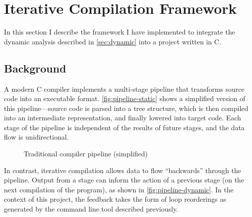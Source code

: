 \documentclass[journal]{IEEEtran}
\begin{document}
\section{Iterative Compilation Framework} \label{sec:iter}

In this section I describe the framework I have implemented to integrate the
dynamic analysis described in \autoref{sec:dynamic} into a project written in C.

\subsection{Background}

A modern C compiler implements a multi-stage pipeline that transforms source
code into an executable format. \autoref{fig:pipeline-static} shows a simplified
version of this pipeline---source code is parsed into a tree structure, which is
then compiled into an intermediate representation, and finally lowered into
target code. Each stage of the pipeline is independent of the results of future
stages, and the data flow is unidirectional.

\begin{figure}[h] 
  \centering 
  \caption{Traditional compiler pipeline (simplified)} 
  \label{fig:pipeline-static}
\end{figure}

In contrast, iterative compilation allows data to flow ``backwards'' through the
pipeline. Output from a stage can inform the action of a previous stage (on the
next compilation of the program), as shown in \autoref{fig:pipeline-dynamic}. In
the context of this project, the feedback takes the form of loop reorderings as
generated by the command line tool described previously.
\end{document}
